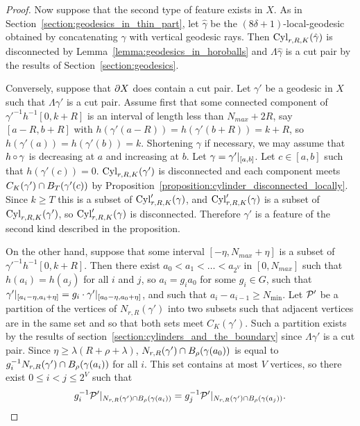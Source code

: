 \begin{proof}
  Now suppose that the second type of feature exists in $X$.
  As in Section~\ref{section:geodesics_in_thin_part}, let $\hat\gamma$ be the $(8\delta + 1)$-local-geodesic obtained by concatenating $\gamma$ with vertical geodesic rays. 
  Then $\operatorname{Cyl}_{r, R, K}(\hat\gamma)$ is disconnected by Lemma~\ref{lemma:geodesics_in_horoballs} and $\Lambda\hat\gamma$ is a cut pair by the results of Section~\ref{section:geodesics}.

  Conversely, suppose that $\partial X$ does contain a cut pair. 
  Let $\gamma'$ be a geodesic in $X$ such that $\Lambda\gamma'$ is a cut pair. 
  Assume first that some connected component of $\gamma'^{-1} h^{-1}[0, k + R]$ is an interval of length less than $N_{max} + 2R$, say $[a - R, b + R]$ with $h(\gamma'(a - R)) = h(\gamma'(b + R)) = k + R$, so $h(\gamma'(a)) = h(\gamma'(b)) = k$. 
  Shortening $\gamma$ if necessary, we may assume that $h \operatorname{\circ} \gamma$ is decreasing at $a$ and increasing at $b$.
  Let $\gamma = \gamma' \vert_{[a, b]}$.  
  Let $c \in [a, b]$ such that $h(\gamma'(c)) = 0$.  
  $\operatorname{Cyl}_{r, R, K}(\gamma')$ is disconnected and each component meets $C_K(\gamma') \cap B_{T}(\gamma'(c))$ by Proposition~\ref{proposition:cylinder_disconnected_locally}. 
  Since $k \geq T$ this is a subset of $\operatorname{Cyl}'_{r, R, K}(\gamma)$, and $\operatorname{Cyl}'_{r, R, K}(\gamma)$ is  a subset of $\operatorname{Cyl}_{r, R, K}(\gamma')$, so $\operatorname{Cyl}_{r, R, K}'(\gamma)$ is disconnected. 
  Therefore $\gamma'$ is a feature of the second kind described in the proposition.

  On the other hand, suppose that some interval $[-\eta, N_{max} + \eta]$ is a subset of $\gamma'^{-1} h^{-1}[0, k + R]$. 
  Then there exist $a_0 < a_1 < \dots < a_{2^V}$ in $[0, N_{max}]$ such that $h(a_i) = h(a_j)$ for all $i$ and $j$, so $a_i = g_i a_0$ for some $g_i \in G$, such that $\gamma'\vert_{[a_i - \eta, a_i + \eta]} = g_i \cdot \gamma'\vert_{[a_0 - \eta, a_0 + \eta]}$, and such that $a_i - a_{i - 1} \geq N_\text{min}$. 
  Let $\mathcal{P}'$ be a partition of the vertices of $N_{r, R}(\gamma')$ into two subsets such that adjacent vertices are in the same set and so that both sets meet $C_K(\gamma')$. 
  Such a partition exists by the results of section~\ref{section:cylinders_and_the_boundary} since $\Lambda\gamma'$ is a cut pair. 
  Since $\eta \geq \lambda(R + \rho + \lambda)$, $N_{r, R}(\gamma') \cap B_{\rho}(\gamma(a_0))$ is equal to $g_i^{-1} N_{r, R}(\gamma') \cap B_{\rho}(\gamma(a_i))$ for all $i$.  
  This set contains at most $V$ vertices, so there exist $0 \leq i < j \leq 2^V$ such that
  \begin{align}
  g_i^{-1}\mathcal{P}'\vert_{N_{r, R}(\gamma') \cap
  B_{\rho}(\gamma(a_i))} = g_j^{-1}\mathcal{P}'\vert_{N_{r, R}(\gamma')
  \cap B_{\rho}(\gamma(a_j))}.
  \end{align}


\end{proof}
